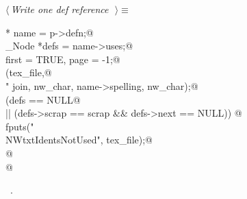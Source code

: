 \documentclass{report}
\begin{document}
\begin{flushleft} \small
\begin{minipage}{\linewidth} \label{scrap235}
$\langle\,${\it Write one def reference}\nobreak\ {\footnotesize {}}$\,\rangle\equiv$
\vspace{-1ex}
\begin{list}{}{} \item
\mbox{}\verb@Name * name = p->defn;@\\
\mbox{}\verb@Scrap_Node *defs = name->uses;@\\
\mbox{}\verb@int first = TRUE, page = -1;@\\
\mbox{}\verb@fprintf(tex_file,@\\
\mbox{}\verb@        "%c \\verb%c%s%c\\nobreak\\ ",@\\
\mbox{}\verb@        join, nw_char, name->spelling, nw_char);@\\
\mbox{}\verb@if (defs == NULL@\\
\mbox{}\verb@    || (defs->scrap == scrap && defs->next == NULL)) {@\\
\mbox{}\verb@  fputs("\\NWtxtIdentsNotUsed", tex_file);@\\
\mbox{}\verb@}@\\
\mbox{}@\\
\mbox{}\verb@@{\NWsep}
\end{list}
\vspace{-1ex}
\footnotesize\addtolength{\baselineskip}{-1ex}
\begin{list}{}{\setlength{\itemsep}{-\parsep}\setlength{\itemindent}{-\leftmargin}}
\item \NWtxtMacroRefIn\ .
\end{list}

\end{minipage}
\end{flushleft}
\end{document}
